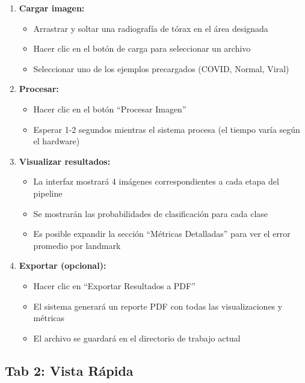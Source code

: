 \begin{enumerate}
    \item \textbf{Cargar imagen:}
    \begin{itemize}
        \item Arrastrar y soltar una radiografía de tórax en el área designada
        \item Hacer clic en el botón de carga para seleccionar un archivo
        \item Seleccionar uno de los ejemplos precargados (COVID, Normal, Viral)
    \end{itemize}

    \item \textbf{Procesar:}
    \begin{itemize}
        \item Hacer clic en el botón ``Procesar Imagen''
        \item Esperar 1-2 segundos mientras el sistema procesa (el tiempo varía según el hardware)
    \end{itemize}

    \item \textbf{Visualizar resultados:}
    \begin{itemize}
        \item La interfaz mostrará 4 imágenes correspondientes a cada etapa del pipeline
        \item Se mostrarán las probabilidades de clasificación para cada clase
        \item Es posible expandir la sección ``Métricas Detalladas'' para ver el error promedio por landmark
    \end{itemize}

    \item \textbf{Exportar (opcional):}
    \begin{itemize}
        \item Hacer clic en ``Exportar Resultados a PDF''
        \item El sistema generará un reporte PDF con todas las visualizaciones y métricas
        \item El archivo se guardará en el directorio de trabajo actual
    \end{itemize}
\end{enumerate}

\subsection{Tab 2: Vista Rápida}

